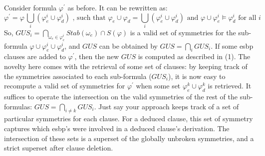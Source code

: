 Consider formula $\varphi^\prime$ as before. It can be rewritten as:
$$\varphi^\prime=\varphi \, \underset{i}{\bigcup}(\varphi_e^i \cup \varphi_d^i) \text{ , such that } \varphi_e \cup \varphi_d = \underset{i}{\bigcup}(\varphi_e^i \cup \varphi_d^i) \text{ and } \varphi \cup \varphi_e^i \models \varphi_d^i  \text{ for all } i$$
So, $GUS_i = \underset{\omega_e \in \varphi_e^i}{\bigcap}Stab(\omega_e) \cap S(\varphi)$ is a valid set of symmetries for the sub-formula $\varphi \cup \varphi_e^i \cup \varphi_d^i$, and $GUS$ can be obtained by $GUS = \underset{i}{\bigcap} GUS_i$. If some esbp clauses are added to $\varphi^\prime$, then the new $GUS$ is computed as described in (1). The novelty here comes with the retrieval of some set of clauses: by keeping track of the symmetries associated to each sub-formula ($GUS_i$), it is now easy to recompute a valid set of symmetries for $\varphi^\prime$ when some set
$\varphi_e^k \cup \varphi_d^k$ is retrieved. It suffices to operate the intersection on the valid symmetries of the rest of the sub-formulas: $GUS = \underset{i \neq k}{\bigcap} GUS_i$.
Just say your approach keeps track of a set of particular symmetries for each clause. For a deduced clause, this set of symmetry captures which esbp's were involved in a deduced clause's derivation. The intersection of these sets is a superset of the globally unbroken symmetries, and a strict superset after clause deletion.
